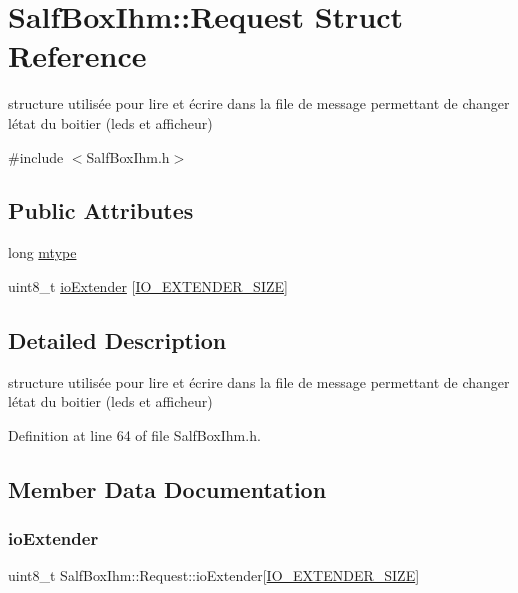 \hypertarget{struct_salf_box_ihm_1_1_request}{}\section{Salf\+Box\+Ihm\+:\+:Request Struct Reference}
\label{struct_salf_box_ihm_1_1_request}


structure utilisée pour lire et écrire dans la file de message permettant de changer l\textquotesingle{}état du boitier (leds et afficheur)  




{\ttfamily \#include $<$Salf\+Box\+Ihm.\+h$>$}

\subsection*{Public Attributes}
\begin{DoxyCompactItemize}
\item 
long \hyperlink{struct_salf_box_ihm_1_1_request_a1804201607b20e22ef55bb9439622c3d}{mtype}
\item 
uint8\+\_\+t \hyperlink{struct_salf_box_ihm_1_1_request_abb453bb2db46073bed9e60c2cf5a0454}{io\+Extender} \mbox{[}\hyperlink{class_salf_box_ihm_a18d938d3fb8caaa41d3ac73ff1b44528}{I\+O\+\_\+\+E\+X\+T\+E\+N\+D\+E\+R\+\_\+\+S\+I\+ZE}\mbox{]}
\end{DoxyCompactItemize}


\subsection{Detailed Description}
structure utilisée pour lire et écrire dans la file de message permettant de changer l\textquotesingle{}état du boitier (leds et afficheur) 

Definition at line 64 of file Salf\+Box\+Ihm.\+h.



\subsection{Member Data Documentation}
\mbox{\label{struct_salf_box_ihm_1_1_request_abb453bb2db46073bed9e60c2cf5a0454}} 
\subsubsection{\texorpdfstring{io\+Extender}{ioExtender}}
{\footnotesize\ttfamily uint8\+\_\+t Salf\+Box\+Ihm\+::\+Request\+::io\+Extender\mbox{[}\hyperlink{class_salf_box_ihm_a18d938d3fb8caaa41d3ac73ff1b44528}{I\+O\+\_\+\+E\+X\+T\+E\+N\+D\+E\+R\+\_\+\+S\+I\+ZE}\mbox{]}}



